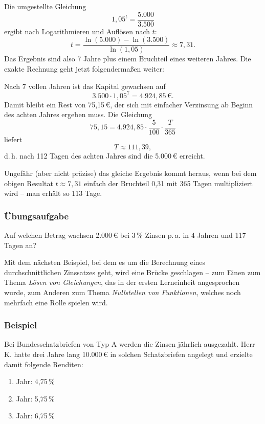 Die umgestellte Gleichung
\[ 1{,}05^t = \frac{5.000}{3.500} \]
ergibt nach Logarithmieren und Auflösen nach $t$:
\[ t = \frac{\ln(5.000) - \ln(3.500)}{\ln(1{,}05)} \approx 7{,}31 . \]
Das Ergebnis sind also 7 Jahre plus einem Bruchteil eines weiteren Jahres. Die exakte Rechnung geht jetzt folgendermaßen weiter:

Nach 7 vollen Jahren ist das Kapital gewachsen auf
\[ 3.500 \cdot 1{,}05^7 = 4.924{,}85\,€ . \]
Damit bleibt ein Rest von 75{,}15\,€, der sich mit einfacher Verzinsung ab Beginn des achten Jahres ergeben muss. Die Gleichung
\[ 75{,}15 = 4.924{,}85 \cdot \frac{5}{100} \cdot \frac{T}{365} \]
liefert
\[ T \approx 111{,}39 , \]
d.\,h. nach 112 Tagen des achten Jahres sind die 5.000\,€ erreicht.

Ungefähr (aber nicht präzise) das gleiche Ergebnis kommt heraus, wenn bei dem obigen Resultat $t \approx 7{,}31$ einfach der Bruchteil 0{,}31 mit 365 Tagen multipliziert wird -- man erhält so 113 Tage.\beispielende

\subsubsection{Übungsaufgabe}

\begin{graukasten}
  Auf welchen Betrag wachsen 2.000\,€ bei 3\,\% Zinsen p.\,a. in 4 Jahren und 117 Tagen an?
\end{graukasten}

Mit dem nächsten Beispiel, bei dem es um die Berechnung eines durchschnittlichen Zinssatzes geht, wird eine Brücke geschlagen -- zum Einen zum Thema \emph{Lösen von Gleichungen}, das in der ersten Lerneinheit angesprochen wurde, zum Anderen zum Thema \emph{Nullstellen von Funktionen}, welches noch mehrfach eine Rolle spielen wird.

\subsubsection{Beispiel}

Bei Bundesschatzbriefen von Typ A werden die Zinsen jährlich ausgezahlt. Herr K. hatte drei Jahre lang 10.000\,€ in solchen Schatzbriefen angelegt und erzielte damit folgende Renditen:
\begin{enumerate}
  \item Jahr: 4{,}75\,\%
  \item Jahr: 5{,}75\,\%
  \item Jahr: 6{,}75\,\%
\end{enumerate}

